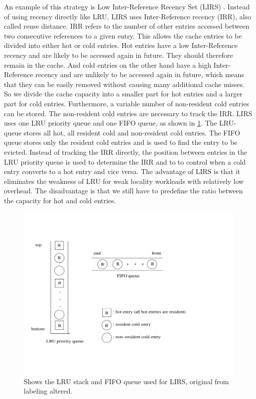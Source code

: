 \documentclass[
	12pt,
	a4paper,
	abstract,
	bibliography=totoc,
	chapterprefix,
	headings=openright,
	numbers=endperiod,
	parskip=half,
	twoside,
]{scrreprt}
\begin{document}
An example of this strategy is Low Inter-Reference Recency Set (LIRS) \cite{10.1145/511399.511340}.
Instead of using recency directly like LRU, LIRS uses Inter-Reference recency (IRR), also called reuse distance.
IRR refers to the number of other entries accessed between two consecutive references to a given entry.
This allows the cache entries to be divided into either hot or cold entries.
Hot entries have a low Inter-Reference recency and are likely to be accessed again in future.
They should therefore remain in the cache.
And cold entries on the other hand have a high Inter-Reference recency and are unlikely to be accessed again in future, 
which means that they can be easily removed without causing many additional cache misses.
So we divide the cache capacity into a smaller part for hot entries and a larger part for cold entries.
Furthermore, a variable number of non-resident cold entries can be stored.
The non-resident cold entries are necessary to track the IRR.
LIRS uses one LRU priority queue and one FIFO queue, as shown in \cref{fig:lirs queues}.
The LRU-queue stores all hot, all resident cold and non-resident cold entries.
The FIFO queue stores only the resident cold entries and is used to find the entry to be evicted.
Instead of tracking the IRR directly, the position between entries in the LRU priority queue is used to determine the IRR and to 
to control when a cold entry converts to a hot entry and vice versa.
The advantage of LIRS is that it eliminates the weakness of LRU for weak locality workloads with relatively low overhead.
The disadvantage is that we still have to predefine the ratio between the capacity for hot and cold entries.

\begin{figure}[ht]
	\centering
	\includegraphics[scale=0.5]{lirs_queues.jpg}
	\caption{Shows the LRU stack and FIFO queue used for LIRS, original from \cite{10.1145/511399.511340} labeling  altered.}
		\label{fig:lirs queues}
\end{figure}
\end{document}

